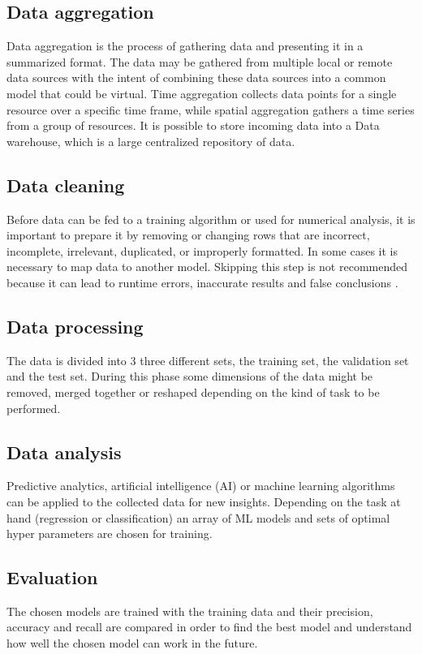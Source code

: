 \subsection{Data aggregation}
Data aggregation is the process of gathering data and presenting it in a summarized format. The data may be gathered from multiple local or remote data sources with the intent of combining these data sources into a common model that could be virtual. Time aggregation collects data points for a single resource over a specific time frame, while spatial aggregation gathers a time series from a group of resources. It is possible to store incoming data into a Data warehouse, which is a large centralized repository of data.

\subsection{Data cleaning}
Before data can be fed to a training algorithm or used for numerical analysis, it is important to prepare it by removing or changing rows that are incorrect, incomplete, irrelevant, duplicated, or improperly formatted. In some cases it is necessary to map data to another model. Skipping this step is not recommended because it can lead to runtime errors, inaccurate results and false conclusions \cite{quantcloud}. 

\subsection{Data processing}
The data is divided into 3 three different sets, the training set, the validation set and the test set. During this phase some dimensions of the data might be removed, merged together or reshaped depending on the kind of task to be performed. 

\subsection{Data analysis}
 Predictive analytics, artificial intelligence (AI) or machine learning algorithms can be applied to the collected data for new insights. Depending on the task at hand (regression or classification) an array of ML models and sets of optimal hyper parameters are chosen for training. 

\subsection{Evaluation}
The chosen models are trained with the training data and their precision, accuracy and recall are compared in order to find the best model and understand how well the chosen model can work in the future.

